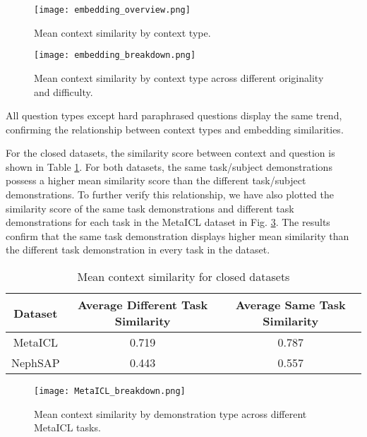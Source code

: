 \documentclass{article}
\begin{document}
    \begin{figure}[b!]
        \centering
        \texttt{[image: embedding\_overview.png]}
        \caption{Mean context similarity by context type.} 
        \label{fig:mean_context_similarity_by_context_type}
    \end{figure}
    
    \begin{figure}[b!]
        \centering
        \texttt{[image: embedding\_breakdown.png]}
        \caption{Mean context similarity by context type across different originality and difficulty.}
        \label{fig:mean_context_similarity_by_context_type_break_down}
    \end{figure}
    
    All question types except hard paraphrased questions display the same trend, confirming the relationship between context types and embedding similarities. 

    For the closed datasets, the similarity score between context and question is shown in Table \ref{tab:similarity}. For both datasets, the same task/subject demonstrations possess a higher mean similarity score than the different task/subject demonstrations. To further verify this relationship, we have also plotted the similarity score of the same task demonstrations and different task demonstrations for each task in the MetaICL dataset in Fig. \ref{fig:mean_context_similarity_MetalICL}. The results confirm that the same task demonstration displays higher mean similarity than the different task demonstration in every task in the dataset.

    \renewcommand{\arraystretch}{1.5}
    \begin{table}[h]
    \centering
    \caption{Mean context similarity for closed datasets}
    \label{tab:similarity}
    \begin{tabular}{c|c|c}
    \hline\hline
        \textbf{Dataset} & \textbf{Average Different Task Similarity} & \textbf{Average Same Task Similarity} \\ \hline
        MetaICL           & 0.719                                     & 0.787                                 \\ \hline
        NephSAP           & 0.443                                     & 0.557                                 \\\hline\hline
    \end{tabular}
    \end{table}

     \begin{figure}[h]
        \centering
        \texttt{[image: MetaICL\_breakdown.png]}
        \caption{Mean context similarity by demonstration type across different MetaICL tasks.} 
        \label{fig:mean_context_similarity_MetalICL}
    \end{figure}
    
\end{document}

